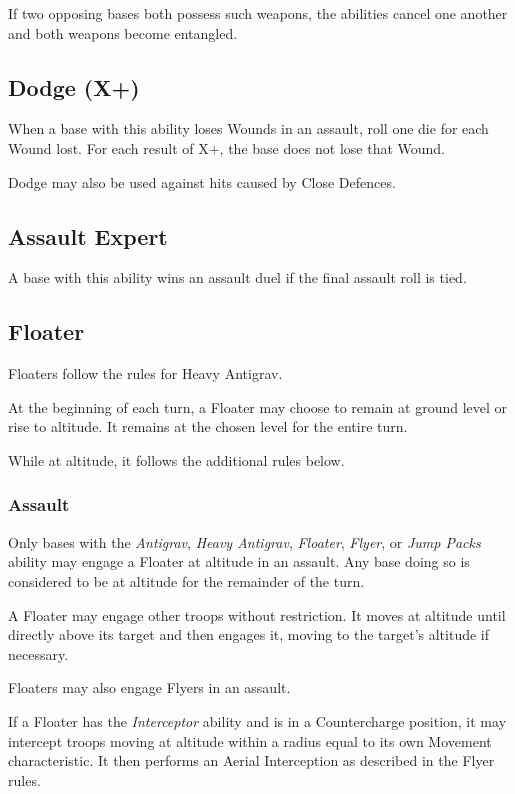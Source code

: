 If two opposing bases both possess such weapons, the abilities cancel one another and both weapons become entangled.

\subsection{Dodge (X+)}

When a base with this ability loses Wounds in an assault, roll one die for each Wound lost. For each result of X+, the base does not lose that Wound.

Dodge may also be used against hits caused by Close Defences.

\subsection{Assault Expert}

A base with this ability wins an assault duel if the final assault roll is tied.

\subsection{Floater}

Floaters follow the rules for Heavy Antigrav.

At the beginning of each turn, a Floater may choose to remain at ground level or rise to altitude. It remains at the chosen level for the entire turn.

While at altitude, it follows the additional rules below.

\subsubsection{Assault}

Only bases with the \textit{Antigrav}, \textit{Heavy Antigrav}, \textit{Floater}, \textit{Flyer}, or \textit{Jump Packs} ability may engage a Floater at altitude in an assault. Any base doing so is considered to be at altitude for the remainder of the turn.

A Floater may engage other troops without restriction. It moves at altitude until directly above its target and then engages it, moving to the target's altitude if necessary.

Floaters may also engage Flyers in an assault.

If a Floater has the \textit{Interceptor} ability and is in a Countercharge position, it may intercept troops moving at altitude within a radius equal to its own Movement characteristic. It then performs an Aerial Interception as described in the Flyer rules.

